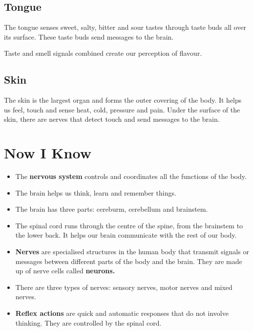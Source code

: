\subsection{Tongue}
The tongue senses sweet, salty, bitter and sour tastes through taste buds all over its surface. These taste buds send messages to the brain.
\vspace{0.1in}
\par
Taste and smell signals combined create our perception of flavour.
\vspace{1.1in}
\subsection{Skin}
The skin is the largest organ and forms the outer covering of the body. It helps us feel, touch and sense heat, cold, pressure and pain. Under the surface of the skin, there are nerves that detect touch and send messages to the brain.
\section{Now I Know}
\begin{itemize}
    \item The \textbf{nervous system} controls and coordinates all the functions of the body.
    \item The brain helps us think, learn and remember things.
    \item The brain has three parts: cereburm, cerebellum and brainstem.
    \item The spinal cord runs through the centre of the spine, from the brainstem to the lower back. It helps our brain communicate with the rest of our body.
    \item \textbf{Nerves} are specialised structures in the human body that transmit signals or messages between different parts of the body and the brain. They are made up of nerve cells called \textbf{neurons.}
    \item There are three types of nerves: sensory nerves, motor nerves and mixed nerves.
    \item \textbf{Reflex actions} are quick and automatic responses that do not involve thinking. They are controlled by the spinal cord.
\end{itemize}